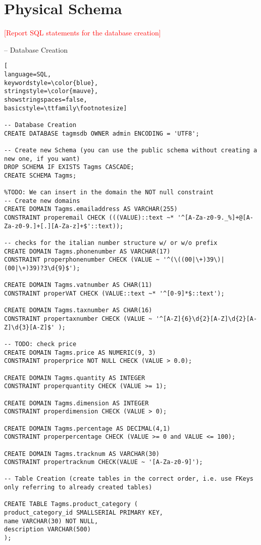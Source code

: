 \section{Physical Schema}
\textcolor{red}{[Report SQL statements for the database creation]}

-- Database Creation
\begin{lstlisting}[
language=SQL,
keywordstyle=\color{blue},
stringstyle=\color{mauve},
showstringspaces=false,
basicstyle=\ttfamily\footnotesize]

-- Database Creation
CREATE DATABASE tagmsdb OWNER admin ENCODING = 'UTF8';

-- Create new Schema (you can use the public schema without creating a new one, if you want)
DROP SCHEMA IF EXISTS Tagms CASCADE;
CREATE SCHEMA Tagms;

%TODO: We can insert in the domain the NOT null constraint
-- Create new domains
CREATE DOMAIN Tagms.emailaddress AS VARCHAR(255)
CONSTRAINT properemail CHECK (((VALUE)::text ~* '^[A-Za-z0-9._%]+@[A-Za-z0-9.]+[.][A-Za-z]+$'::text));

-- checks for the italian number structure w/ or w/o prefix
CREATE DOMAIN Tagms.phonenumber AS VARCHAR(17)
CONSTRAINT properphonenumber CHECK (VALUE ~ '^(\((00|\+)39\)|(00|\+)39)?3\d{9}$');

CREATE DOMAIN Tagms.vatnumber AS CHAR(11)
CONSTRAINT properVAT CHECK (VALUE::text ~* '^[0-9]*$::text');

CREATE DOMAIN Tagms.taxnumber AS CHAR(16)
CONSTRAINT propertaxnumber CHECK (VALUE ~ '^[A-Z]{6}\d{2}[A-Z]\d{2}[A-Z]\d{3}[A-Z]$' );

-- TODO: check price
CREATE DOMAIN Tagms.price AS NUMERIC(9, 3)
CONSTRAINT properprice NOT NULL CHECK (VALUE > 0.0);

CREATE DOMAIN Tagms.quantity AS INTEGER
CONSTRAINT properquantity CHECK (VALUE >= 1);

CREATE DOMAIN Tagms.dimension AS INTEGER
CONSTRAINT properdimension CHECK (VALUE > 0);

CREATE DOMAIN Tagms.percentage AS DECIMAL(4,1)
CONSTRAINT properpercentage CHECK (VALUE >= 0 and VALUE <= 100);

CREATE DOMAIN Tagms.tracknum AS VARCHAR(30)
CONSTRAINT propertracknum CHECK(VALUE ~ '[A-Za-z0-9]');

-- Table Creation (create tables in the correct order, i.e. use FKeys only referring to already created tables)

CREATE TABLE Tagms.product_category (
product_category_id SMALLSERIAL PRIMARY KEY,
name VARCHAR(30) NOT NULL,
description VARCHAR(500)
);


\end{lstlisting}
